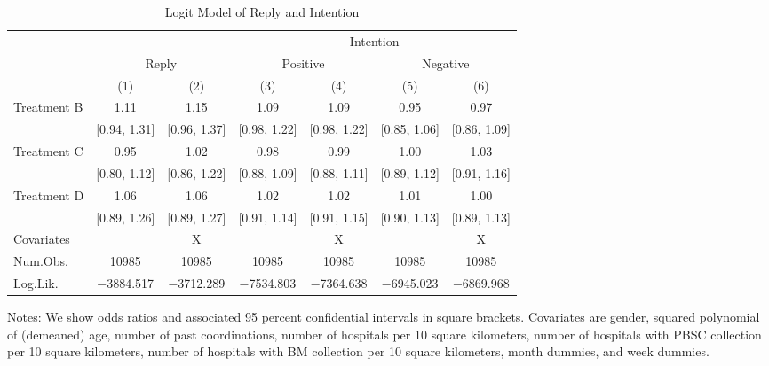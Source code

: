 \documentclass[
  lualatex,
  11pt,
  a4paper
]{article}
\begin{document}
\begin{table}[H]

\caption{\label{tab:logit-stock}Logit Model of Reply and Intention}
\centering
\fontsize{9}{11}\selectfont
\begin{threeparttable}
\begin{tabular}[t]{lcccccc}
\toprule
\multicolumn{3}{c}{ } & \multicolumn{4}{c}{Intention} \\
\cmidrule(l{3pt}r{3pt}){4-7}
\multicolumn{1}{c}{ } & \multicolumn{2}{c}{Reply} & \multicolumn{2}{c}{Positive} & \multicolumn{2}{c}{Negative} \\
\cmidrule(l{3pt}r{3pt}){2-3} \cmidrule(l{3pt}r{3pt}){4-5} \cmidrule(l{3pt}r{3pt}){6-7}
  & (1) & (2) & (3) & (4) & (5) & (6)\\
\midrule
Treatment B & \num{1.11} & \num{1.15} & \num{1.09} & \num{1.09} & \num{0.95} & \num{0.97}\\
 & {}[\num{0.94}, \num{1.31}] & {}[\num{0.96}, \num{1.37}] & {}[\num{0.98}, \num{1.22}] & {}[\num{0.98}, \num{1.22}] & {}[\num{0.85}, \num{1.06}] & {}[\num{0.86}, \num{1.09}]\\
Treatment C & \num{0.95} & \num{1.02} & \num{0.98} & \num{0.99} & \num{1.00} & \num{1.03}\\
 & {}[\num{0.80}, \num{1.12}] & {}[\num{0.86}, \num{1.22}] & {}[\num{0.88}, \num{1.09}] & {}[\num{0.88}, \num{1.11}] & {}[\num{0.89}, \num{1.12}] & {}[\num{0.91}, \num{1.16}]\\
Treatment D & \num{1.06} & \num{1.06} & \num{1.02} & \num{1.02} & \num{1.01} & \num{1.00}\\
 & {}[\num{0.89}, \num{1.26}] & {}[\num{0.89}, \num{1.27}] & {}[\num{0.91}, \num{1.14}] & {}[\num{0.91}, \num{1.15}] & {}[\num{0.90}, \num{1.13}] & {}[\num{0.89}, \num{1.13}]\\
\midrule
Covariates &  & X &  & X &  & X\\
Num.Obs. & \num{10985} & \num{10985} & \num{10985} & \num{10985} & \num{10985} & \num{10985}\\
Log.Lik. & \num{-3884.517} & \num{-3712.289} & \num{-7534.803} & \num{-7364.638} & \num{-6945.023} & \num{-6869.968}\\
\bottomrule
\end{tabular}
\begin{tablenotes}
\item Notes: We show odds ratios and associated 95 percent confidential intervals in square brackets. Covariates are gender, squared polynomial of (demeaned) age, number of past coordinations, number of hospitals per 10 square kilometers, number of hospitals with PBSC collection per 10 square kilometers, number of hospitals with BM collection per 10 square kilometers, month dummies, and week dummies.
\end{tablenotes}
\end{threeparttable}
\end{table}
\end{document}
